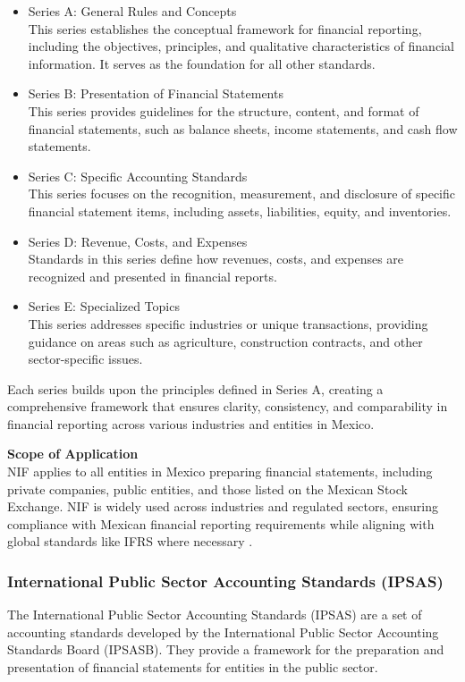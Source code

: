 \documentclass[10pt]{article}
\begin{document}
\begin{itemize}
    \item Series A: General Rules and Concepts\\
This series establishes the conceptual framework for financial reporting, including the objectives, principles, and qualitative characteristics of financial information. It serves as the foundation for all other standards.

    \item Series B: Presentation of Financial Statements\\
This series provides guidelines for the structure, content, and format of financial statements, such as balance sheets, income statements, and cash flow statements.

    \item Series C: Specific Accounting Standards\\
This series focuses on the recognition, measurement, and disclosure of specific financial statement items, including assets, liabilities, equity, and inventories.

    \item Series D: Revenue, Costs, and Expenses\\
Standards in this series define how revenues, costs, and expenses are recognized and presented in financial reports.

    \item Series E: Specialized Topics\\
This series addresses specific industries or unique transactions, providing guidance on areas such as agriculture, construction contracts, and other sector-specific issues.

\end{itemize}

Each series builds upon the principles defined in Series A, creating a comprehensive framework that ensures clarity, consistency, and comparability in financial reporting across various industries and entities in Mexico.

\textbf{Scope of Application}\\
NIF applies to all entities in Mexico preparing financial statements, including private companies, public entities, and those listed on the Mexican Stock Exchange. NIF is widely used across industries and regulated sectors, ensuring compliance with Mexican financial reporting requirements while aligning with global standards like IFRS where necessary \cite{Toku}.

\subsubsection{International Public Sector Accounting Standards (IPSAS)}\label{subsubsec:international_public_sector_accounting_standards__ipsas_}
The International Public Sector Accounting Standards (IPSAS) are a set of accounting standards developed by the International Public Sector Accounting Standards Board (IPSASB). They provide a framework for the preparation and presentation of financial statements for entities in the public sector.
\end{document}
